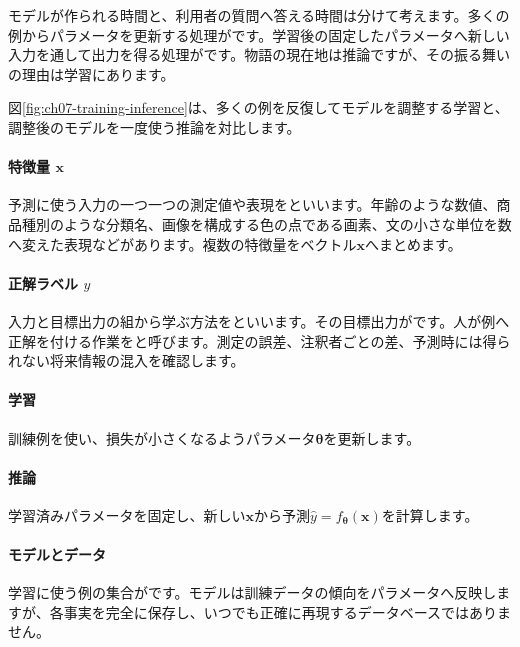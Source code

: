 モデルが作られる時間と、利用者の質問へ答える時間は分けて考えます。多くの例からパラメータを更新する処理がです。学習後の固定したパラメータへ新しい入力を通して出力を得る処理がです。物語の現在地は推論ですが、その振る舞いの理由は学習にあります。

図\ref{fig:ch07-training-inference}は、多くの例を反復してモデルを調整する学習と、調整後のモデルを一度使う推論を対比します。

\begingroup
\begingroup
\paragraph{特徴量 $\mathbf{x}$}
        予測に使う入力の一つ一つの測定値や表現をといいます。年齢のような数値、商品種別のような分類名、画像を構成する色の点である画素、文の小さな単位を数へ変えた表現などがあります。複数の特徴量をベクトル$\mathbf{x}$へまとめます。

\paragraph{正解ラベル $y$}
        入力と目標出力の組から学ぶ方法をといいます。その目標出力がです。人が例へ正解を付ける作業をと呼びます。測定の誤差、注釈者ごとの差、予測時には得られない将来情報の混入を確認します。

\par
\endgroup
\medskip
\begingroup
\paragraph{学習}
        訓練例を使い、損失が小さくなるようパラメータ$\boldsymbol{\theta}$を更新します。

\paragraph{推論}
        学習済みパラメータを固定し、新しい$\mathbf{x}$から予測$\hat{y}=f_{\boldsymbol{\theta}}(\mathbf{x})$を計算します。

\par
\endgroup
  \vspace{4mm}
\paragraph{モデルとデータ}
    学習に使う例の集合がです。モデルは訓練データの傾向をパラメータへ反映しますが、各事実を完全に保存し、いつでも正確に再現するデータベースではありません。

